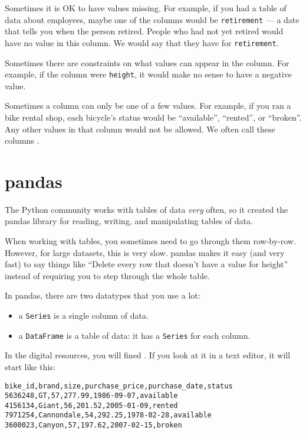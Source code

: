 Sometimes it is OK to have values missing.  For example, if you had a
table of data about employees, maybe one of the columns would be
\texttt{retirement} --- a date that tells you when the person retired.  People who
had not yet retired would have no value in this column.  We would say
that they have  for \texttt{retirement}.

Sometimes there are constraints on what values can appear in the
column.  For example, if the column were \texttt{height}, it would make no
sense to have a negative value.

Sometimes a column can only be one of a few values. For example, if
you ran a bike rental shop, each bicycle's status would be ``available'',
``rented'', or ``broken''.  Any other values in that column would not
be allowed.  We often call these columns .

\section{pandas}

The Python community works with tables of data \emph{very} often, so it
created the pandas library for reading, writing, and manipulating
tables of data.

When working with tables, you sometimes need to go through them
row-by-row. However, for large datasets, this is very slow. pandas
makes it easy (and very fast) to say things like ``Delete every row
that doesn't have a value for height'' instead of requiring you to
step through the whole table.

In pandas, there are two datatypes that you use a lot:
\begin{itemize}
\item a \texttt{Series} is a single column of data.
\item a \texttt{DataFrame} is a table of data: it has a \texttt{Series} for each column.
\end{itemize}

In the digital resources, you will fined . If you
look at it in a text editor, it will start like this:
\begin{Verbatim}
bike_id,brand,size,purchase_price,purchase_date,status
5636248,GT,57,277.99,1986-09-07,available
4156134,Giant,56,201.52,2005-01-09,rented
7971254,Cannondale,54,292.25,1978-02-28,available
3600023,Canyon,57,197.62,2007-02-15,broken
\end{Verbatim}

